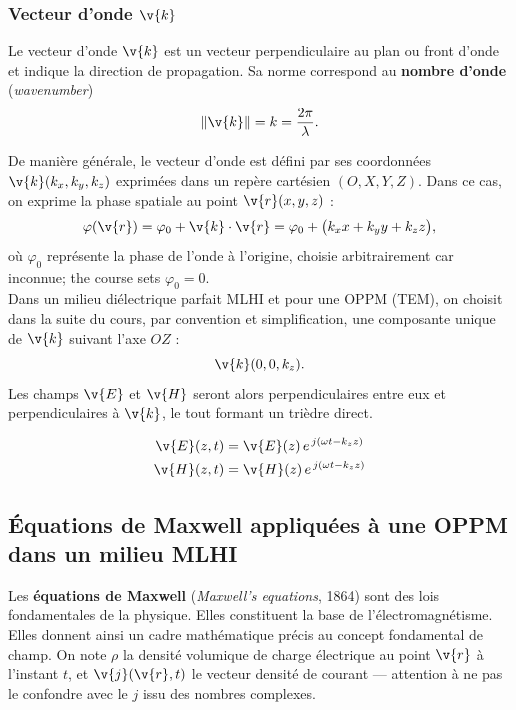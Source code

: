 \subsubsection{Vecteur d'onde $\v{k}$}

\begin{definition}
  Le vecteur d'onde $\v{k}$ est un vecteur perpendiculaire au plan ou front
  d'onde et indique la direction de propagation. Sa norme correspond au
  \textbf{nombre d'onde} (\textit{wavenumber})
  \[
    \|\v{k}\| = k = \frac{2\pi}{\lambda}.
  \]
\end{definition}

De manière générale, le vecteur d'onde est défini par ses coordonnées
$\v{k}(k_x,k_y,k_z)$ exprimées dans un repère cartésien $(O,X,Y,Z)$. Dans ce
cas, on exprime la phase spatiale au point $\v{r}(x,y,z)$ :
\[
  \varphi(\v{r}) = \varphi_0 + \v{k}\cdot\v{r}
                 = \varphi_0 + \big(k_x x + k_y y + k_z z\big),
\]
où $\varphi_0$ représente la phase de l'onde à l'origine, choisie
arbitrairement car inconnue; the course sets $\varphi_0 = 0$.\\

Dans un milieu diélectrique parfait MLHI et pour une OPPM (TEM), on choisit
dans la suite du cours, par convention et simplification, une composante unique
de $\v{k}$ suivant l'axe $OZ$ :
\[
  \v{k}(0,0,k_z).
\]
Les champs $\v{E}$ et $\v{H}$ seront alors perpendiculaires entre eux et
perpendiculaires à $\v{k}$, le tout formant un trièdre direct.

\begin{conclusion}
  \[
    \begin{aligned}
      \v{E}(z,t) &= \v{E}(z)\,e^{\,j(\omega t - k_z z)} \\
      \v{H}(z,t) &= \v{H}(z)\,e^{\,j(\omega t - k_z z)}
    \end{aligned}
  \]
\end{conclusion}

\subsection{Équations de Maxwell appliquées à une OPPM dans un milieu MLHI}

Les \textbf{équations de Maxwell} (\textit{Maxwell's equations}, 1864) sont des
lois fondamentales de la physique. Elles constituent la base de
l'électromagnétisme. Elles donnent ainsi un cadre mathématique précis au
concept fondamental de champ. On note $\rho$ la densité volumique de charge
électrique au point $\v{r}$ à l'instant $t$, et $\v{j}(\v{r},t)$ le vecteur
densité de courant --- attention à ne pas le confondre avec le $j$ issu des
nombres complexes.

